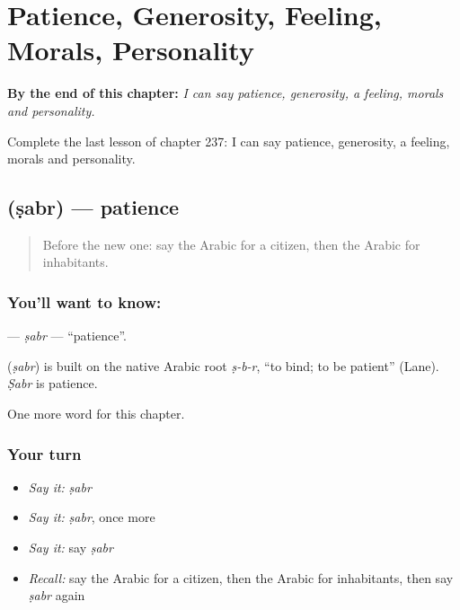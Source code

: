 
\chapter{Patience, Generosity, Feeling, Morals, Personality}
\label{ch:ar-patience-generosity-feeling-morals-personality}

\begin{chapteropening}
\textbf{By the end of this chapter:} \emph{I can say patience, generosity, a feeling, morals and personality.}

Complete the last lesson of chapter 237: I can say patience, generosity, a feeling, morals and personality.
\end{chapteropening}

\section[\texorpdfstring{\ar{صبر} (ṣabr)}{صبر (ṣabr)}]{ (ṣabr) — patience}

\label{lesson:AR-C237-sabr}



\begin{quote}
Before the new one: say the Arabic for a citizen, then the Arabic for inhabitants.
\end{quote}

\subsection*{You'll want to know: }
\textbf{} — \emph{ṣabr} — \textquotedblleft{}patience\textquotedblright{}.

\begin{cousinweb}
\textbf{} (\emph{ṣabr}) is built on the native Arabic root \emph{ṣ-b-r}, \textquotedblleft{}to bind; to be patient\textquotedblright{} (Lane). \emph{Ṣabr} is patience.
\end{cousinweb}

\begin{grammarlens}[title={What you've built}]
One more word for this chapter.
\end{grammarlens}

\subsection*{Your turn}
\begin{itemize}
\raggedright
  \item \emph{Say it:} \emph{ṣabr}
  \item \emph{Say it:} \emph{ṣabr}, once more
  \item \emph{Say it:} say \emph{ṣabr}
  \item \emph{Recall:} say the Arabic for a citizen, then the Arabic for inhabitants, then say \emph{ṣabr} again
\end{itemize}

